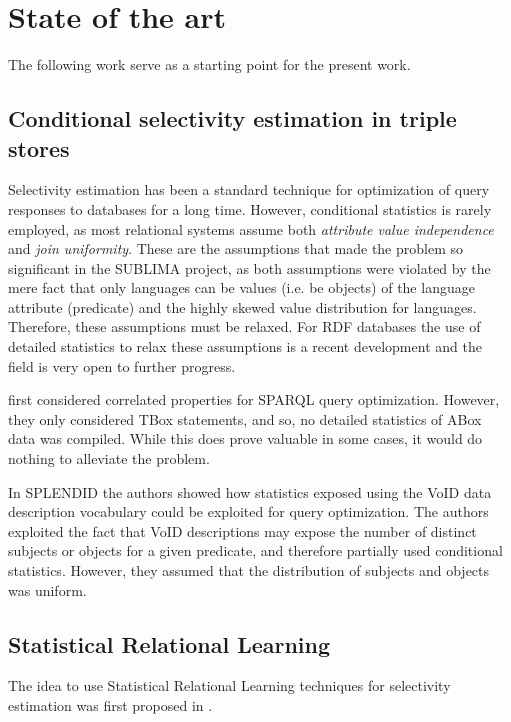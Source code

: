 
\section{State of the art}

The following work serve as a starting point for the present work.

\subsection{Conditional selectivity estimation in triple stores}

Selectivity estimation has been a standard technique for optimization
of query responses to databases for a long time. However, conditional
statistics is rarely employed, as most relational systems assume both
\emph{attribute value independence} and \emph{join
  uniformity}. These are the assumptions
that made the \langcase{} problem so significant in the SUBLIMA
project, as both assumptions were violated by the mere fact that only
languages can be values (i.e. be objects) of the language attribute
(predicate) and the highly skewed value distribution for
languages. Therefore, these assumptions must be relaxed. For RDF
databases the use of detailed statistics to relax these assumptions is
a recent development and the field is very open to further progress.

\cite{Lv:2009:SEC:1685170.1685590} first considered correlated
properties for SPARQL query optimization. However, they only
considered TBox statements, and so, no detailed statistics of ABox
data was compiled. While this does prove valuable in some cases, it
would do nothing to alleviate the \langcase{} problem.

In SPLENDID\cite{splendid} the authors showed how statistics exposed
using the VoID data description vocabulary\cite{void} could be
exploited for query optimization. The authors exploited the fact that
VoID descriptions may expose the number of distinct subjects or
objects for a given predicate, and therefore partially used
conditional statistics. However, they assumed that the distribution of
subjects and objects was uniform.

\subsection{Statistical Relational Learning}

The idea to use Statistical Relational Learning techniques for
selectivity estimation was first proposed in \cite{selectivityPRM}.


